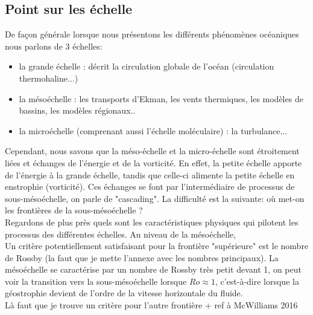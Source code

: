 \documentclass{rapportECC}
\begin{document}
\subsection{Point sur les échelle}
De façon générale lorsque nous présentons les différents phénomènes océaniques nous parlons de 3 échelles:
\begin{itemize}
    \item la grande échelle : décrit la circulation globale de l'océan (circulation thermohaline...)
    \item la mésoéchelle : les transports d'Ekman, les vents thermiques, les modèles de bassins, les modèles régionaux..
    \item la microéchelle (comprenant aussi l'échelle moléculaire) : la turbulance...
\end{itemize}

Cependant, nous savons que la méso-échelle et la micro-échelle sont étroitement liées et échanges de l'énergie et de la vorticité. En effet, la petite échelle apporte de l'énergie à la grande échelle, tandis que celle-ci alimente la petite échelle en enstrophie (vorticité). Ces échanges se font par l'intermédiaire de processus de sous-mésoéchelle, on parle de "cascading". La difficulté est la suivante: où met-on les frontières de la sous-mésoéchelle ? \\
Regardons de plus près quels sont les caractéristiques physiques qui pilotent les processus des différentes échelles. Au niveau de la mésoéchelle,\\

Un critère potentiellement satisfaisant pour la frontière "supérieure" est le nombre de Rossby (la faut que je mette l'annexe avec les nombres principaux). La mésoéchelle se caractérise par un nombre de Rossby très petit devant 1, on peut voir la transition vers la sous-mésoéchelle lorsque $Ro \approx 1$, c'est-à-dire lorsque la géostrophie devient de l'ordre de la vitesse horizontale du fluide. \\
Là faut que je trouve un critère pour l'autre frontière + ref à McWilliams 2016
\end{document}
